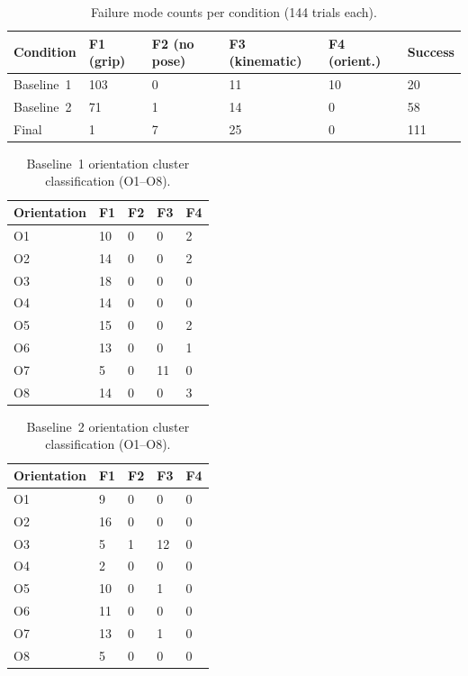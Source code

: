 \documentclass[12pt,a4paper]{report}
\begin{document}
\begin{table}[htbp]
  \centering
  \caption{Failure mode counts per condition (144 trials each).}
  \label{tab:failure-modes}
  \begin{tabular}{llllll}
    \toprule
    Condition & F1 (grip) & F2 (no pose) & F3 (kinematic) &
      F4 (orient.) & Success \\
    \midrule
    Baseline~1 & 103 & 0 & 11 & 10 & 20 \\
    Baseline~2 & 71  & 1 & 14 &  0 & 58 \\
    Final      &   1 & 7 & 25 &  0 & 111 \\
    \bottomrule
  \end{tabular}
\end{table}

\begin{table}[htbp]
  \centering
  \caption{Baseline~1 orientation cluster classification (O1--O8).}
  \label{tab:baseline1-orientation-clusters}
  \begin{tabular}{lllll}
    \toprule
    Orientation & F1 & F2 & F3 & F4 \\
    \midrule
    O1 & 10 & 0 &  0 & 2 \\
    O2 & 14 & 0 &  0 & 2 \\
    O3 & 18 & 0 &  0 & 0 \\
    O4 & 14 & 0 &  0 & 0 \\
    O5 & 15 & 0 &  0 & 2 \\
    O6 & 13 & 0 &  0 & 1 \\
    O7 &  5 & 0 & 11 & 0 \\
    O8 & 14 & 0 &  0 & 3 \\
    \bottomrule
  \end{tabular}
\end{table}

\begin{table}[htbp]
  \centering
  \caption{Baseline~2 orientation cluster classification (O1--O8).}
  \label{tab:baseline2-orientation-clusters}
  \begin{tabular}{lllll}
    \toprule
    Orientation & F1 & F2 & F3 & F4 \\
    \midrule
    O1 &  9 & 0 &  0 & 0 \\
    O2 & 16 & 0 &  0 & 0 \\
    O3 &  5 & 1 & 12 & 0 \\
    O4 &  2 & 0 &  0 & 0 \\
    O5 & 10 & 0 &  1 & 0 \\
    O6 & 11 & 0 &  0 & 0 \\
    O7 & 13 & 0 &  1 & 0 \\
    O8 &  5 & 0 &  0 & 0 \\
    \bottomrule
  \end{tabular}
\end{table}
\end{document}
